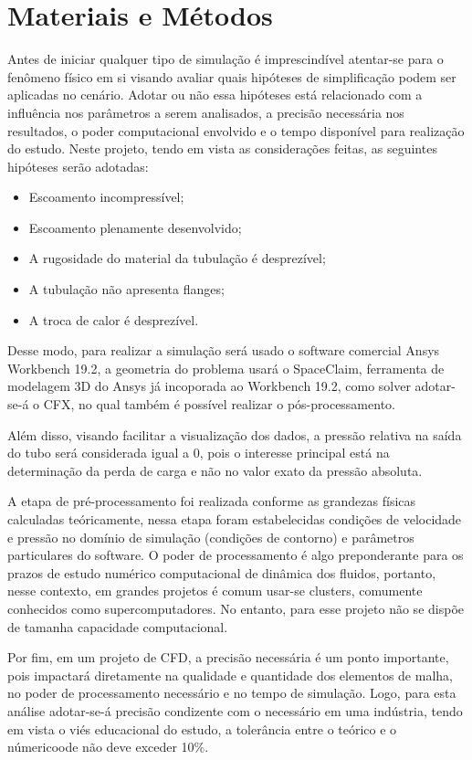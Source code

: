 \documentclass[12pt]{article}
\begin{document}
\section{Materiais e Métodos}
Antes de iniciar qualquer tipo de simulação é imprescindível atentar-se para o fenômeno físico em si visando avaliar quais hipóteses de simplificação podem ser aplicadas no cenário. Adotar ou não essa hipóteses está relacionado com a influência nos parâmetros a serem analisados, a precisão necessária nos resultados, o poder computacional envolvido e o tempo disponível para realização do estudo.
Neste projeto, tendo em vista as considerações feitas, as seguintes hipóteses serão adotadas: 
\begin{itemize}
	\item Escoamento incompressível;
	\item Escoamento plenamente desenvolvido;
	\item A rugosidade do material da tubulação é desprezível;
	\item A tubulação não apresenta flanges;
	\item A troca de calor é desprezível.
\end{itemize}

Desse modo, para realizar a simulação será usado o software comercial Ansys Workbench 19.2, a geometria do problema usará o SpaceClaim, ferramenta de modelagem 3D do Ansys já incoporada ao Workbench 19.2, como solver adotar-se-á o CFX, no qual também é possível realizar o pós-processamento.

Além disso, visando facilitar a visualização dos dados, a pressão relativa na saída do tubo será considerada igual a 0, pois o interesse principal está na determinação da perda de carga e não no valor exato da pressão absoluta. 

A etapa de pré-processamento foi realizada conforme as grandezas físicas calculadas teóricamente, nessa etapa foram estabelecidas condições de velocidade e pressão no domínio de simulação (condições de contorno) e parâmetros particulares do software. O poder de processamento é algo preponderante para os prazos de estudo numérico computacional de dinâmica dos fluidos, portanto, nesse contexto, em grandes projetos é comum usar-se clusters, comumente conhecidos como supercomputadores. No entanto, para esse projeto não se dispõe de tamanha capacidade computacional. 

Por fim, em um projeto de CFD, a precisão necessária é um ponto importante, pois impactará diretamente na qualidade e quantidade dos elementos de malha, no poder de processamento necessário e no tempo de simulação. Logo, para esta análise adotar-se-á precisão condizente com o necessário em uma indústria, tendo em vista o viés educacional do estudo, a tolerância entre o teórico e o númericoode não deve exceder 10\%.
\end{document}

